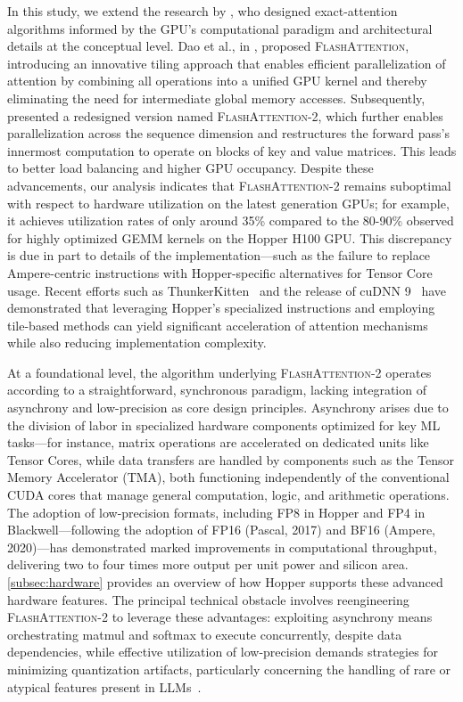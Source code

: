 In this study, we extend the research by \citet{dao2022flashattention}, who designed exact-attention algorithms informed by the GPU’s computational paradigm and architectural details at the conceptual level. Dao et al., in \citep{dao2022flashattention}, proposed \textsc{FlashAttention}, introducing an innovative tiling approach that enables efficient parallelization of attention by combining all operations into a unified GPU kernel and thereby eliminating the need for intermediate global memory accesses. Subsequently, \citet{dao2023flashattention2} presented a redesigned version named \textsc{FlashAttention-2}, which further enables parallelization across the sequence dimension and restructures the forward pass’s innermost computation to operate on blocks of key and value matrices. This leads to better load balancing and higher GPU occupancy. Despite these advancements, our analysis indicates that \textsc{FlashAttention-2} remains suboptimal with respect to hardware utilization on the latest generation GPUs; for example, it achieves utilization rates of only around 35\% compared to the 80-90\% observed for highly optimized GEMM kernels on the Hopper H100 GPU. This discrepancy is due in part to details of the implementation—such as the failure to replace Ampere-centric instructions with Hopper-specific alternatives for Tensor Core usage. Recent efforts such as ThunkerKitten~\citep{spector2024thunder} and the release of cuDNN 9~\citep{cudnn9} have demonstrated that leveraging Hopper’s specialized instructions and employing tile-based methods can yield significant acceleration of attention mechanisms while also reducing implementation complexity.

At a foundational level, the algorithm underlying \textsc{FlashAttention-2} operates according to a straightforward, synchronous paradigm, lacking integration of asynchrony and low-precision as core design principles. Asynchrony arises due to the division of labor in specialized hardware components optimized for key ML tasks—for instance, matrix operations are accelerated on dedicated units like Tensor Cores, while data transfers are handled by components such as the Tensor Memory Accelerator (TMA), both functioning independently of the conventional CUDA cores that manage general computation, logic, and arithmetic operations. The adoption of low-precision formats, including FP8 in Hopper and FP4 in Blackwell—following the adoption of FP16 (Pascal, 2017) and BF16 (Ampere, 2020)—has demonstrated marked improvements in computational throughput, delivering two to four times more output per unit power and silicon area. \cref{subsec:hardware} provides an overview of how Hopper supports these advanced hardware features. The principal technical obstacle involves reengineering \textsc{FlashAttention-2} to leverage these advantages: exploiting asynchrony means orchestrating matmul and softmax to execute concurrently, despite data dependencies, while effective utilization of low-precision demands strategies for minimizing quantization artifacts, particularly concerning the handling of rare or atypical features present in LLMs~\citep{dettmers2208llm, sun2024massive}.

